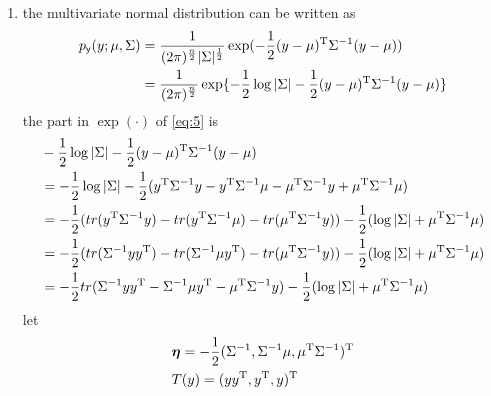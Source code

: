 \documentclass[a4paper]{article}
\begin{document}
{\begin{enumerate}
\begin{enumerate}
\begin{proof}
\begin{equation*}
\begin{aligned}
        \hat{P}_{\rvy}(l) &= \frac1m \sum_{i=1}^m P(y^{(i)}=l|x^{(i)};\theta,b) 
            \sum_{j=1}^m \1\{x^{(i)}=x^{(j)}\} \\
        \hat{P}_{\rvy}(l) &= \sum_{x\in \mathcal{X}} P_{\rvy|\rvx}(l|x)\hat{P}_{\rvx}(x) 
        \end{aligned}
        \end{equation*}
    \end{proof}
\end{enumerate}
    \item the multivariate normal distribution can be written as 
    \begin{equation}
    \begin{aligned}
    p_{\mathsf{y}}(y;\mu,\Sigma) &= \frac1{(2\pi)^{\frac{n}2}|\Sigma|^{\frac12}} 
        \exp(-\frac12(y-\mu)^{\mathrm{T}}\Sigma^{-1}(y-\mu)) \\ 
      &= \frac1{(2\pi)^{\frac{n}2}} \exp\{ -\frac12\log|\Sigma| -\frac12(y-\mu)^{\mathrm{T}}\Sigma^{-1}(y-\mu)\} \\
    \end{aligned}
    \label{eq:5}
    \end{equation}
    the part in $\exp(\cdot)$ of \eqref{eq:5} is
    \begin{equation}
    \begin{aligned}
    &-\frac12\log|\Sigma| -\frac12(y-\mu)^{\mathrm{T}}\Sigma^{-1}(y-\mu) \\
    &= -\frac12\log|\Sigma| - \frac12(y^{\mathrm{T}}\Sigma^{-1}y-y^{\mathrm{T}}\Sigma^{-1}\mu-\mu^{\mathrm{T}}\Sigma^{-1}y
        + \mu^{\mathrm{T}}\Sigma^{-1}\mu) \\
    &= -\frac12(tr(y^{\mathrm{T}}\Sigma^{-1}y)-tr(y^{\mathrm{T}}\Sigma^{-1}\mu)-tr(\mu^{\mathrm{T}}\Sigma^{-1}y) )
        -\frac12(\log|\Sigma| + \mu^{\mathrm{T}}\Sigma^{-1}\mu) \\
    &= -\frac12(tr(\Sigma^{-1}yy^{\mathrm{T}})-tr(\Sigma^{-1}\mu y^{\mathrm{T}})-tr(\mu^{\mathrm{T}}\Sigma^{-1}y) )
        -\frac12(\log|\Sigma| + \mu^{\mathrm{T}}\Sigma^{-1}\mu) \\
    &= -\frac12tr(\Sigma^{-1}yy^{\mathrm{T}}-\Sigma^{-1}\mu y^{\mathrm{T}}-\mu^{\mathrm{T}}\Sigma^{-1}y)
        -\frac12(\log|\Sigma| + \mu^{\mathrm{T}}\Sigma^{-1}\mu) 
    \end{aligned}
    \label{eq:6}
    \end{equation}
    let 
    \begin{equation}
    \begin{align}
    &\bm{\eta} = -\frac12(\Sigma^{-1},\Sigma^{-1}\mu,\mu^{\T}\Sigma^{-1})^{\T} \\
    &T(y) = (yy^{\T},y^{\T},y)^{\T}
    \end{align}

\end{equation}
\end{enumerate}}
\end{document}
